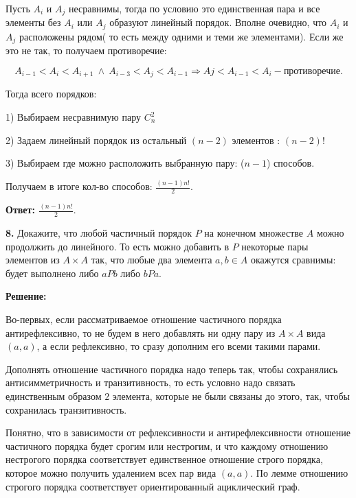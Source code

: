 \documentclass[a4paper,12pt]{article} %
\begin{document}
Пусть $A_i$ и $A_j$ несравнимы, тогда по условию это единственная пара и все элементы без $A_i$ или $A_j$ образуют линейный порядок. Вполне очевидно, что $A_i$ и $A_j$ расположены рядом( то есть между одними и теми же элементами). Если же это не так, то получаем противоречие: 

\[ A_{i - 1} < A_i < A_{i + 1}\ \wedge \ A_{i - 3} < A_j <A_{i - 1} \Rightarrow  A{j} < A_{i-1} < A_i - \textbf{противоречие.}\]

Тогда всего порядков: 

1) Выбираем несравнимую пару $C_n^2$

2) Задаем линейный порядок из остальный $(n - 2)$ элементов : $(n - 2)!$

3) Выбираем где можно расположить выбранную пару: ($n - 1$) способов.

Получаем в итоге кол-во способов: $\frac{(n - 1) n!}{2}.$ 

\begin{flushright}
\begin{large}
\textbf {Ответ: $\frac{(n - 1) n!}{2}.$}
\end{large}
\end{flushright}

{\bf 8.} Докажите, что любой частичный порядок $P$ на конечном множестве $A$ можно продолжить до линейного. То есть можно добавить в $P$ некоторые пары элементов из $A \times A$ так, что любые два элемента $a, b \in A$ окажутся сравнимы: будет выполнено либо $aPb$ либо $bPa$.
\begin{center}
\bfseries
{\Large Решение: }
\end{center}

Во-первых, если рассматриваемое отношение частичного порядка антирефлексивно, то не будем в него добавлять ни одну пару из $A \times A$ вида $(a,a)$, а если рефлексивно, то сразу дополним его всеми такими парами.

Дополнять отношение частичного порядка надо теперь так, чтобы сохранялись антисимметричность и транзитивность, то есть условно надо связать единственным образом $2$ элемента, которые не были связаны до этого, так, чтобы сохранилась транзитивность.

Понятно, что в зависимости от рефлексивности и антирефлексивности отношение частичного порядка будет срогим или нестрогим, и что каждому отношению нестрогого порядка соответствует единственное отношение строго порядка, которое можно получить удалением всех пар вида $(a,a)$. По лемме отношению строгого порядка соответствует ориентированный ациклический граф.
\end{document}
